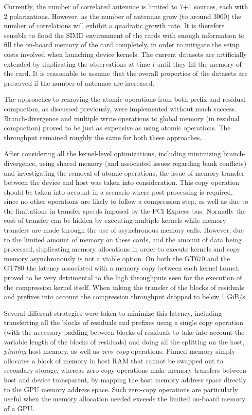   Currently, the number of correlated antennae is limited to 7+1 sources, each with 2 polarizations. However, as the number of antennae grow (to around 3000) the number of correlations will exhibit 
  a quadratic growth rate. It is therefore sensible to flood the SIMD environment of the cards with enough information to fill the on-board memory of the card completely, in order to mitigate the setup 
  costs involved when launching device kernels. The current datasets are artificially extended by duplicating the observations at time \textit{t} until they fill the memory of the card. 
  It is reasonable to assume that the overall properties of the datasets are preserved if the number of antennae are increased.
  
  The approaches to removing the atomic operations from both prefix and residual compaction, as discussed previously, were implemented without much success. Branch-divergence and multiple
  write operations to global memory (in residual compaction) proved to be just as expensive as using atomic operations. The throughput remained roughly the same for both these approaches.
  
  After considering all the kernel-level optimizations, including minimizing branch-divergence, using shared memory (and associated issues regarding bank conflicts) and investigating the removal of atomic 
  operations, the issue of memory transfer between the device and host was taken into consideration. This copy operation should be taken into account in a scenario where post-processing is required, since
  no other operations are likely to follow a compression step, as well as due to the limitations in transfer speeds imposed by the PCI Express bus. Normally the cost of transfer can be hidden by executing multiple 
  kernels while memory transfers are made through the use of asynchronous memory calls. However, due to the limited amount of memory on these cards, and the amount of data being processed, duplicating memory allocations
  in order to execute kernels and copy memory asynchronously is not a viable option. On both the GT670 and the GT780 the latency associated with a memory copy between each kernel launch proved to be very detrimental to
  the high throughputs seen for the execution of the compression kernel itself. When taking the transfer of the blocks of residuals and prefixes into account the compression throughput dropped to below 1 GiB/s.
  
  Several different strategies were taken to minimize this latency, including transferring all the blocks of residuals and prefixes using a single copy operation (with the necessary padding between blocks of residuals to
  take into account the variable length of the blocks of residuals) and doing all the splitting on the host, \textit{pinning} host memory, as well as \textit{zero-copy} operations. Pinned memory simply allocates a block 
  of memory in host RAM that cannot be swapped out to secondary storage, whereas zero-copy operations make memory transfers between host and device transparent, by mapping the host memory address space directly to the GPU memory 
  address space. Such zero-copy operations are particularly useful when the memory allocation needed exceeds the limited on-board memory of a GPU. 
  
